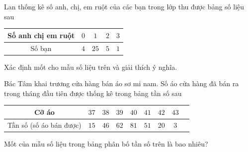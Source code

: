 \begin{bt}%
	Lan thống kê số anh, chị, em ruột của các bạn trong lớp thu được bảng số liệu sau
	\begin{center}
		\begin{tabular}{|c|c|c|c|c|}
			\hline
			Số anh chị em ruột & $0$ & $1$ & $2$ & $3$ \\
			\hline
			Số bạn & $4$ & $25$ & $5$ & $1$ \\
			\hline
		\end{tabular}
	\end{center}
	Xác định mốt cho mẫu số liệu trên và giải thích ý nghĩa.
\end{bt}

\begin{bt}%
	Bác Tâm khai trương cửa hàng bán áo sơ mi nam. Số áo cửa hàng đã bán ra trong tháng đầu tiên được thống kê trong bảng tần số sau
	\begin{center}
		\begin{tabular}{|c|c|c|c|c|c|c|c|c|}
			\hline 
			Cỡ áo	&$37$	&$38$	&$39$	&$40$ &$41$ &$42$ & $43$\\
			\hline 
			Tần số (số áo bán được)	&$15$	&$46$	&$62$	&$81$ &$51$ &$20$ &$3$ \\
			\hline 
		\end{tabular}
	\end{center}
	Mốt của mẫu số liệu trong bảng phân bố tần số trên là bao nhiêu?
\end{bt}

